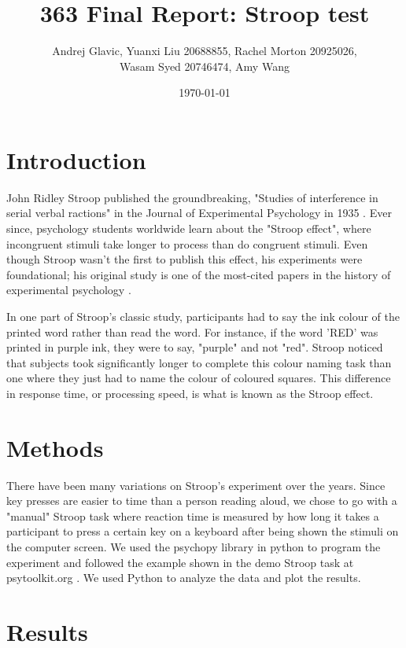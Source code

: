 \documentclass{article}
\author{Andrej Glavic, Yuanxi Liu 20688855, Rachel Morton 20925026,\\ Wasam Syed 20746474, Amy Wang}
\date{\today}
\title{363 Final Report: Stroop test}
\begin{document}
\maketitle
\tableofcontents


\section{Introduction}
\label{sec:orgcbaed77}
John Ridley Stroop published the groundbreaking, "Studies of interference in serial verbal ractions" in the Journal of Experimental Psychology in 1935 \cite{Stroop1935}. Ever since, psychology students worldwide learn about the "Stroop effect", where incongruent stimuli take longer to process than do congruent stimuli. Even though Stroop wasn't the first to publish this effect, his experiments were foundational; his original study is one of the most-cited papers in the history of experimental psychology \cite{MacLeod1991Stroop}.

In one part of Stroop's classic study, participants had to say the ink colour of the printed word rather than read the word. For instance, if the word 'RED' was printed in purple ink, they were to say, "purple" and not "red". Stroop noticed that subjects took significantly longer to complete this colour naming task than one where they just had to name the colour of coloured squares. This difference in response time, or processing speed, is what is known as the Stroop effect.

\section{Methods}
\label{sec:orgd26a65a}
There have been many variations on Stroop's experiment over the years. Since key presses are easier to time than a person reading aloud, we chose to go with a "manual" Stroop task where reaction time is measured by how long it takes a participant to press a certain key on a keyboard after being shown the stimuli on the computer screen. We used the psychopy library in python to program the experiment \cite{Peirce2019Psychopy} and followed the example shown in the demo Stroop task at psytoolkit.org \cite{PsytoolkitStroopDemo}. We used Python to analyze the data and plot the results. 

\section{Results}
\label{sec:org9ed6915}
\end{document}
